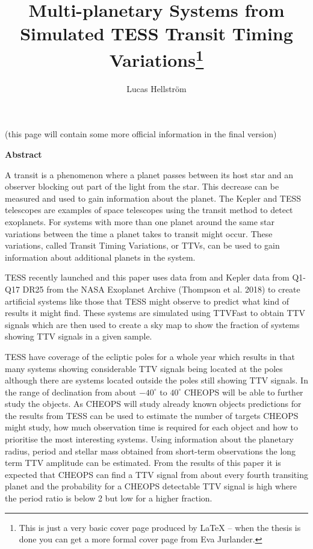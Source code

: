 \documentclass[12pt]{report}
\begin{document}
\title{\huge \bf Multi-planetary Systems from Simulated TESS Transit Timing Variations\footnote{This is just a very basic cover page produced by LaTeX -- when
the thesis is done you can get a more formal cover page from Eva Jurlander.}}
\author{Lucas Hellström}

\thispagestyle{empty} %

\maketitle

\newpage

\thispagestyle{empty}

\begin{center}
  (this page will contain some more official information in the final version)
\end{center}

\newpage

\thispagestyle{empty}

\begin{center}
  {\bf Abstract}
\end{center}
	A transit is a phenomenon where a planet passes between its host star and an observer blocking out part of the light from the star. This decrease can be measured and used to gain information about the planet. The Kepler and TESS telescopes are examples of space telescopes using the transit method to detect exoplanets. For systems with more than one planet around the same star variations between the time a planet takes to transit might occur. These variations, called Transit Timing Variations, or TTVs, can be used to gain information about additional planets in the system.
	
	TESS recently launched and this paper uses data from \cite{2015ApJ...809...77S} and Kepler data from Q1-Q17 DR25 from the NASA Exoplanet Archive (Thompson et al. 2018) to create artificial systems like those that TESS might observe to predict what kind of results it might find. These systems are simulated using TTVFast \citep{2014ApJ...787..132D} to obtain TTV signals which are then used to create a sky map to show the fraction of systems showing TTV signals in a given sample.
	
	TESS have coverage of the ecliptic poles for a whole year which results in that many systems showing considerable TTV signals being located at the poles although there are systems located outside the poles still showing TTV signals. In the range of declination from about $-40^{\circ}$ to $40^{\circ}$ CHEOPS will be able to further study the objects. As CHEOPS will study already known objects predictions for the results from TESS can be used to estimate the number of targets CHEOPS might study, how much observation time is required for each object and how to prioritise the most interesting systems. Using information about the planetary radius, period and stellar mass obtained from short-term observations the long term TTV amplitude can be estimated. From the results of this paper it is expected that CHEOPS can find a TTV signal from about every fourth transiting planet and the probability for a CHEOPS detectable TTV signal is high where the period ratio is below 2 but low for a higher fraction.
	
\end{document}
